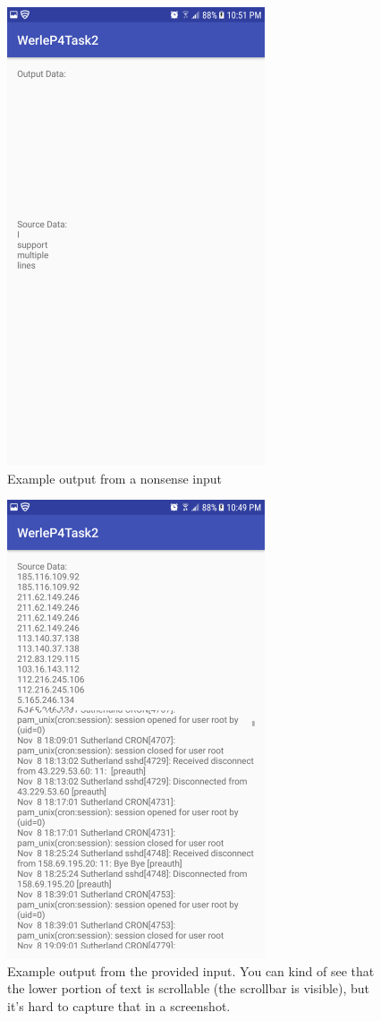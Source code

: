 \documentclass[11pt]{article}
\begin{document}
	\begin{figure}[ht]
	\includegraphics[width=3in]{img/t2s3.png}
	\centering
	\caption{Example output from a nonsense input}
	\end{figure}
	\begin{figure}[ht]
	\includegraphics[width=3in]{img/t2s4.png}
	\centering
	\caption{Example output from the provided input. You can kind of see that the lower portion of text is scrollable (the scrollbar is visible), but it's hard to capture that in a screenshot.}
	\end{figure}
\end{document}

